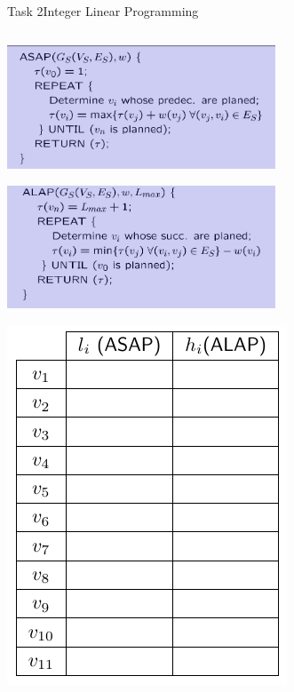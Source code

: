 \begin{frame}[allowframebreaks]{Task 2}{Integer Linear Programming}
\begin{tasknoinc}
\begin{columns}
\begin{column}{.5\textwidth}
      \end{column}
    \end{columns}
  \end{tasknoinc}
  \begin{requirementsnoinc}
    \centering
    \includegraphics[width=0.6\textwidth]{./figures/asap.png}
  \end{requirementsnoinc}
  \begin{requirementsnoinc}
    \centering
    \includegraphics[width=0.6\textwidth]{./figures/alap.png}
  \end{requirementsnoinc}
  \begin{solutionnoinc}
    \centering
    \includegraphics[height=0.6\paperheight]{./figures/task2_earliest_and_latest_starting_times_empty.png}
  \end{solutionnoinc}

\end{frame}
